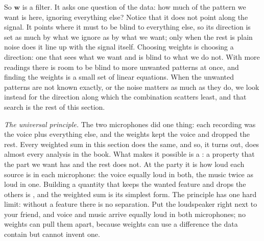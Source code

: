 So $\bm w$ is a filter. It asks one question of the data: how much of the
pattern we want is here, ignoring everything else? Notice that it does not
point along the signal. It points where it must to be blind to everything
else, so its direction is set as much by what we ignore as by what we want;
only when the rest is plain noise does it line up with the signal itself.
Choosing weights is choosing a direction: one that sees what we want and is
blind to what we do not. With
more readings there is room to be blind to more unwanted patterns at once,
and finding the weights is a small set of linear equations. When the
unwanted patterns are not known exactly, or the noise matters as much as
they do, we look instead for the direction along which the combination
scatters least, and that search is the rest of this section.

\emph{The universal principle.} The two microphones did one thing: each
recording was the voice plus everything else, and the weights kept the voice
and dropped the rest. Every weighted sum in this section does the same, and
so, it turns out, does almost every analysis in the book. What makes it
possible is a : a property that the part we want has and
the rest does not. At the party it is how loud each source is in each
microphone: the voice equally loud in both, the music twice as loud in
one. Building a quantity that keeps the wanted feature and drops the others
is , and the weighted sum is its simplest form.
The principle has one hard limit: without a feature there is no
separation. Put the loudspeaker right next to your friend, and voice and
music arrive equally loud in both microphones; no weights can pull them
apart, because weights can use a difference the data contain but cannot
invent one.

